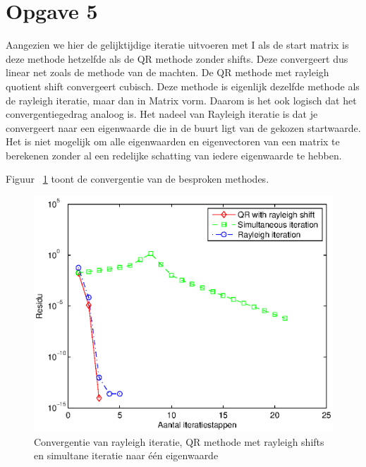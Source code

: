 \documentclass[]{article}
\newcommand{\opgave}[1]{\section*{Opgave #1}}
\begin{document}
\opgave5



Aangezien we hier de gelijktijdige iteratie uitvoeren met I als de start matrix is deze methode hetzelfde als de QR methode zonder shifts. Deze convergeert dus linear net zoals de methode van de machten. De QR methode met rayleigh quotient shift convergeert cubisch. Deze methode is eigenlijk dezelfde methode als de rayleigh iteratie, maar dan in Matrix vorm. Daarom is het ook logisch dat het convergentiegedrag analoog is.
Het nadeel van Rayleigh iteratie is dat je convergeert naar een eigenwaarde die in de buurt ligt van de gekozen startwaarde. Het is niet mogelijk om alle eigenwaarden en eigenvectoren van een matrix te berekenen zonder al een redelijke schatting van iedere eigenwaarde te hebben.

Figuur ~\ref{opgave5} toont de convergentie van de besproken methodes. 

\begin{figure}[h]
\noindent \includegraphics[width=1\linewidth]{opgave5.eps}
\caption{Convergentie van rayleigh iteratie, QR methode met rayleigh shifts en simultane iteratie naar \'{e}\'{e}n eigenwaarde}
\label{opgave5}
\end{figure}
\end{document}
